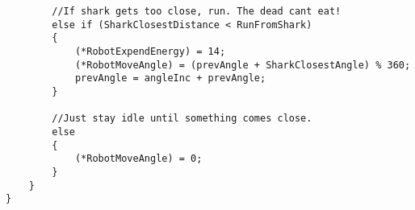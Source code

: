 \documentclass[12pt]{article}
\begin{document}
\begin{verbatim}
        //If shark gets too close, run. The dead cant eat!
        else if (SharkClosestDistance < RunFromShark)
        {
            (*RobotExpendEnergy) = 14;
            (*RobotMoveAngle) = (prevAngle + SharkClosestAngle) % 360;
            prevAngle = angleInc + prevAngle;
        }

        //Just stay idle until something comes close.
        else
        {
            (*RobotMoveAngle) = 0;
        }
    }
}
\end{verbatim}


\end{document}

